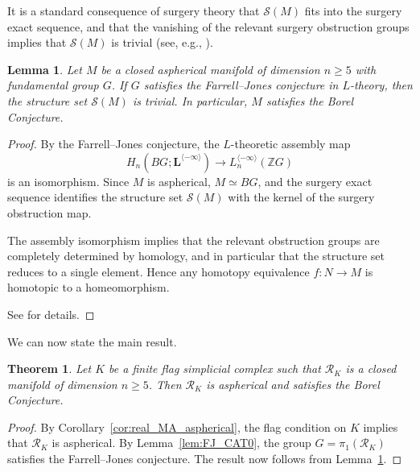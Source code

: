 \documentclass[11pt,a4paper]{article}
\numberwithin{equation}{section}
\newtheorem{lemma}[definition]{Lemma}
\newtheorem{thm}[definition]{Theorem}
\theoremstyle{named}
\begin{document}
It is a standard consequence of surgery theory that $\mathcal{S}(M)$ fits into the surgery exact sequence, and that the vanishing of the relevant surgery obstruction groups implies that $\mathcal{S}(M)$ is trivial (see, e.g., \cite{wall70, lm24}).


\begin{lemma}
\label{lem:FJ_Borel}
Let $M$ be a closed aspherical manifold of dimension $n \geq 5$ with fundamental group $G$. If $G$ satisfies the Farrell--Jones conjecture in $L$-theory, then the structure set $\mathcal{S}(M)$ is trivial. In particular, $M$ satisfies the Borel Conjecture.
\end{lemma}

\begin{proof}
By the Farrell--Jones conjecture, the $L$-theoretic assembly map
\[
H_n(BG; \mathbf{L}^{\langle -\infty \rangle})
\longrightarrow
L_n^{\langle -\infty \rangle}(\mathbb{Z}G)
\]
is an isomorphism. Since $M$ is aspherical, $M \simeq BG$, and the surgery exact sequence identifies the structure set $\mathcal{S}(M)$ with the kernel of the surgery obstruction map.

The assembly isomorphism implies that the relevant obstruction groups are completely determined by homology, and in particular that the structure set reduces to a single element. Hence any homotopy equivalence $f : N \to M$ is homotopic to a homeomorphism.

See \cite{BartelsLuck2012} for details.
\end{proof}

\medskip

We can now state the main result.

\begin{thm}
\label{thm:Borel_main}
Let $K$ be a finite flag simplicial complex such that $\mathcal{R}_K$ is a closed manifold of dimension $n \geq 5$. Then $\mathcal{R}_K$ is aspherical and satisfies the Borel Conjecture.
\end{thm}

\begin{proof}
By Corollary~\ref{cor:real_MA_aspherical}, the flag condition on $K$ implies that $\mathcal{R}_K$ is aspherical. By Lemma~\ref{lem:FJ_CAT0}, the group $G=\pi_1(\mathcal{R}_K)$ satisfies the Farrell--Jones conjecture. The result now follows from Lemma~\ref{lem:FJ_Borel}.
\end{proof}
\end{document}

